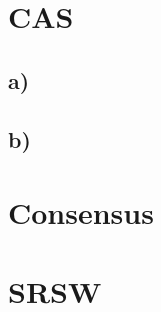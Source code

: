 \documentclass[11pt]{article}
\begin{document}
\maketitle

\section{CAS}
\subsection*{a)} 


\subsection*{b)}


\section{Consensus}

\section{SRSW}
\end{document}
